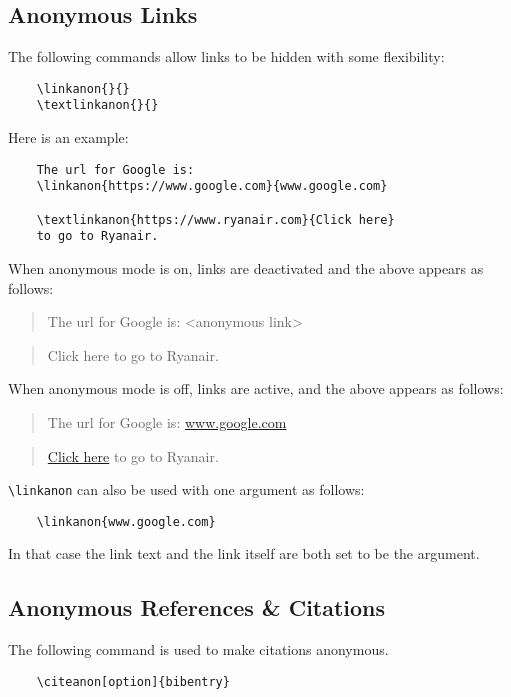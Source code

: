 \documentclass[sigconf, balance=false]{acmart}
\begin{document}
\subsection{Anonymous Links}
\label{sec:links}
The following commands allow links to be hidden with some flexibility: 
\begin{verbatim}
    \linkanon{}{}
    \textlinkanon{}{}
\end{verbatim}

\noindent Here is an example:

\begin{verbatim}
    The url for Google is:
    \linkanon{https://www.google.com}{www.google.com}
    
    \textlinkanon{https://www.ryanair.com}{Click here} 
    to go to Ryanair.
\end{verbatim}

\noindent When anonymous mode is on, links are deactivated and the above appears as follows:
\begin{quote}
    The url for Google is: <anonymous link>
\end{quote}    
\begin{quote}
    Click here to go to Ryanair. 
\end{quote}

\noindent When anonymous mode is off, links are active, and the above appears as follows: 
\begin{quote}
    The url for Google is: \href{www.google.com}{www.google.com}
\end{quote}    
\begin{quote}        
    \href{www.ryanair.com}{Click here} to go to Ryanair.
\end{quote}

\noindent \texttt{\textbackslash linkanon} can also be used with one argument as follows:

\begin{verbatim}
    \linkanon{www.google.com}
\end{verbatim}

\noindent In that case the link text and the link itself are both set to be the argument. 

\subsection{Anonymous References \& Citations}
\label{sec:refs}
The following command is used to make citations anonymous. 

\begin{verbatim}
    \citeanon[option]{bibentry} 
\end{verbatim}
\end{document}
